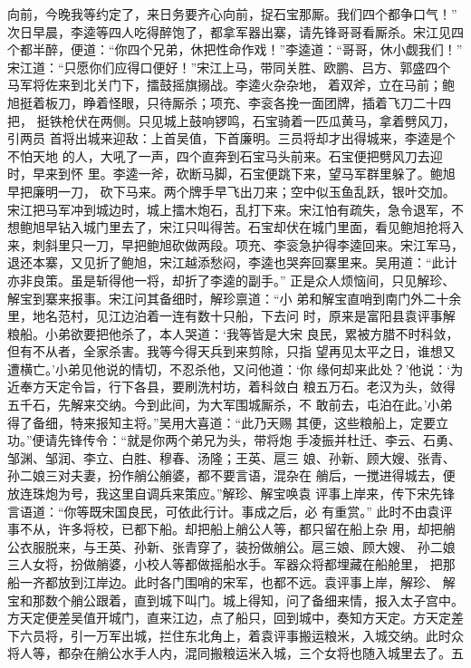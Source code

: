 向前，今晚我等约定了，来日务要齐心向前，捉石宝那厮。我们四个都争口气！”
次日早晨，李逵等四人吃得醉饱了，都拿军器出寨，请先锋哥哥看厮杀。宋江见四
个都半醉，便道：“你四个兄弟，休把性命作戏！”李逵道：“哥哥，休小觑我们！”
宋江道：“只愿你们应得口便好！”宋江上马，带同关胜、欧鹏、吕方、郭盛四个
马军将佐来到北关门下，擂鼓摇旗搦战。李逵火杂杂地，着双斧，立在马前；鲍
旭挺着板刀，睁着怪眼，只待厮杀；项充、李衮各挽一面团牌，插着飞刀二十四把，
挺铁枪伏在两侧。只见城上鼓响锣鸣，石宝骑着一匹瓜黄马，拿着劈风刀，引两员
首将出城来迎敌：上首吴值，下首廉明。三员将却才出得城来，李逵是个不怕天地
的人，大吼了一声，四个直奔到石宝马头前来。石宝便把劈风刀去迎时，早来到怀
里。李逵一斧，砍断马脚，石宝便跳下来，望马军群里躲了。鲍旭早把廉明一刀，
砍下马来。两个牌手早飞出刀来；空中似玉鱼乱跃，银叶交加。
宋江把马军冲到城边时，城上擂木炮石，乱打下来。宋江怕有疏失，急令退军，不
想鲍旭早钻入城门里去了，宋江只叫得苦。石宝却伏在城门里面，看见鲍旭抢将入
来，刺斜里只一刀，早把鲍旭砍做两段。项充、李衮急护得李逵回来。宋江军马，
退还本寨，又见折了鲍旭，宋江越添愁闷，李逵也哭奔回寨里来。吴用道：“此计
亦非良策。虽是斩得他一将，却折了李逵的副手。”
正是众人烦恼间，只见解珍、解宝到寨来报事。宋江问其备细时，解珍禀道：“小
弟和解宝直哨到南门外二十余里，地名范村，见江边泊着一连有数十只船，下去问
时，原来是富阳县袁评事解粮船。小弟欲要把他杀了，本人哭道：‘我等皆是大宋
良民，累被方腊不时科敛，但有不从者，全家杀害。我等今得天兵到来剪除，只指
望再见太平之日，谁想又遭横亡。’小弟见他说的情切，不忍杀他，又问他道：‘你
缘何却来此处？’他说：‘为近奉方天定令旨，行下各县，要刷洗村坊，着科敛白
粮五万石。老汉为头，敛得五千石，先解来交纳。今到此间，为大军围城厮杀，不
敢前去，屯泊在此。’小弟得了备细，特来报知主将。”吴用大喜道：“此乃天赐
其便，这些粮船上，定要立功。”便请先锋传令：“就是你两个弟兄为头，带将炮
手凌振并杜迁、李云、石勇、邹渊、邹润、李立、白胜、穆春、汤隆；王英、扈三
娘、孙新、顾大嫂、张青、孙二娘三对夫妻，扮作艄公艄婆，都不要言语，混杂在
艄后，一搅进得城去，便放连珠炮为号，我这里自调兵来策应。”解珍、解宝唤袁
评事上岸来，传下宋先锋言语道：“你等既宋国良民，可依此行计。事成之后，必
有重赏。”
此时不由袁评事不从，许多将校，已都下船。却把船上艄公人等，都只留在船上杂
用，却把艄公衣服脱来，与王英、孙新、张青穿了，装扮做艄公。扈三娘、顾大嫂、
孙二娘三人女将，扮做艄婆，小校人等都做摇船水手。军器众将都埋藏在船舱里，
把那船一齐都放到江岸边。此时各门围哨的宋军，也都不远。袁评事上岸，解珍、
解宝和那数个艄公跟着，直到城下叫门。城上得知，问了备细来情，报入太子宫中。
方天定便差吴值开城门，直来江边，点了船只，回到城中，奏知方天定。方天定差
下六员将，引一万军出城，拦住东北角上，着袁评事搬运粮米，入城交纳。此时众
将人等，都杂在艄公水手人内，混同搬粮运米入城，三个女将也随入城里去了。五
